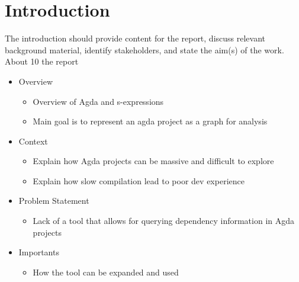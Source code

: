 
\chapter{Introduction}

The introduction should provide content for the report, discuss relevant background
material, identify stakeholders, and state the aim(s) of the work. About 10%
the report

\begin{itemize} 
\item Overview
    \begin{itemize}
    \item Overview of Agda and s-expressions 
    \item Main goal is to represent an agda project as a graph for analysis 
    \end{itemize} 
\item Context
    \begin{itemize}
    \item Explain how Agda projects can be massive and difficult to explore 
    \item Explain how slow compilation lead to poor dev experience 
    \end{itemize} 
\item Problem Statement
    \begin{itemize}
    \item Lack of a tool that allows for querying dependency information in
        Agda projects 
    \end{itemize} 
\item Importants
    \begin{itemize}
    \item How the tool can be expanded and used
    \end{itemize}
\end{itemize}
